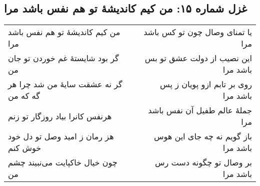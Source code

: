 \begin{center}
\section*{غزل شماره ۱۵: من کیم کاندیشهٔ تو هم نفس باشد مرا}
\label{sec:015}
\begin{longtable}{l p{0.5cm} r}
من کیم کاندیشهٔ تو هم نفس باشد مرا
&&
یا تمنای وصال چون تو کس باشد مرا
\\
گر بود شایستهٔ غم خوردن تو جان من
&&
این نصیب از دولت عشق تو بس باشد مرا
\\
گر نه عشقت سایهٔ من شد چرا هر گه که من
&&
روی بر تابم ازو پویان ز پس باشد مرا
\\
هرنفس کانرا بیاد روزگار تو زنم
&&
جملهٔ عالم طفیل آن نفس باشد مرا
\\
هز رمان ز امید وصل تو دل خود خوش کنم
&&
باز گویم نه چه جای این هوس باشد مرا
\\
چون خیال خاکپایت می‌نبیند چشم من
&&
بر وصال تو چگونه دست رس باشد مرا
\\
\end{longtable}
\end{center}

